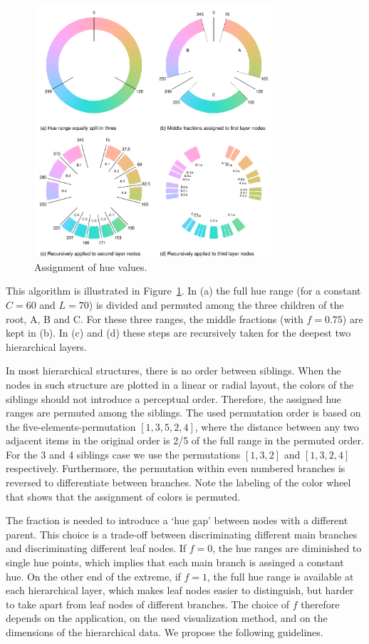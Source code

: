 \documentclass[journal]{vgtc}                %
\begin{document}
\begin{figure}[htb]
  \centering
  \includegraphics[width=3.5in]{hcl_method2.pdf}
  \vspace{-5ex}
  \caption{Assignment of hue values.}\label{fig:wheel}
  \vspace{-4ex}
\end{figure}

This algorithm is illustrated in Figure~\ref{fig:wheel}. In (a) the full hue range (for a constant $C=60$ and $L=70$)  is divided and permuted among the three children of the root, A, B and C. For these three ranges, the middle fractions (with $f=0.75$) are kept in (b).
In (c) and (d) these steps are recursively taken for the deepest two hierarchical layers.

In most hierarchical structures, there is no order between siblings. When the nodes in such structure are plotted in a linear or radial layout, the colors of the siblings should not introduce a perceptual order. Therefore, the assigned hue ranges are permuted among the siblings. The used permutation order is based on the five-elements-permutation $[1, 3, 5, 2, 4]$, where the distance between any two adjacent items in the original order is 2/5 of the full range in the permuted order. For the 3 and 4 siblings case we use the permutations $[1, 3, 2]$ and $[1, 3, 2, 4]$ respectively. Furthermore, the permutation within even numbered branches is reversed to differentiate between branches. Note the labeling of the color wheel that shows that the assignment of colors is permuted.

The fraction is needed to introduce a `hue gap' between nodes with a different parent. This choice is a trade-off between discriminating different main branches and discriminating different leaf nodes. If $f=0$, the hue ranges are diminished to single hue points, which implies that each main branch is assinged a constant hue. On the other end of the extreme, if $f=1$, the full hue range is available at each hierarchical layer, which makes leaf nodes easier to distinguish, but harder to take apart from leaf nodes of different branches.
The choice of $f$ therefore depends on the application, on the used visualization method, and on the dimensions of the hierarchical data. 
We propose the following guidelines.
\end{document}
